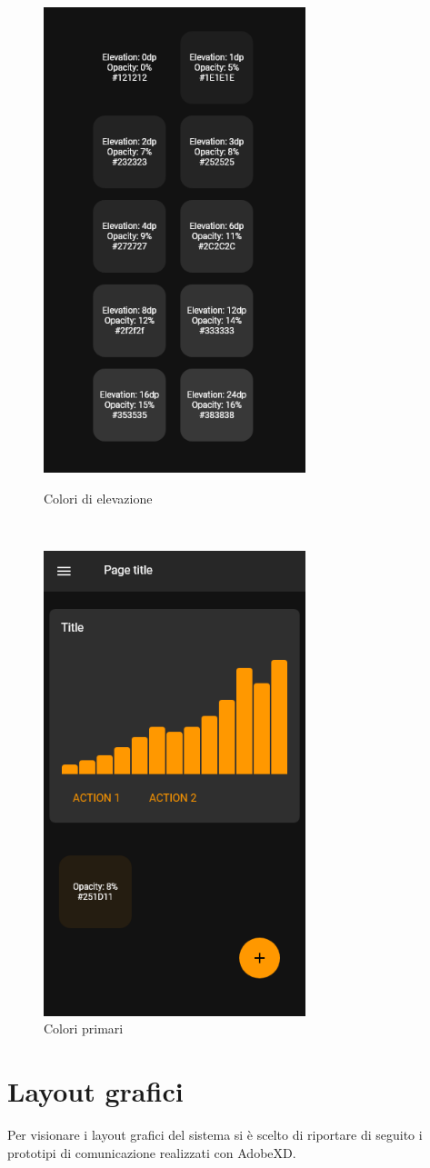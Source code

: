 \begin{figure}
	\centering
	\begin{minipage}[c]{0.45\textwidth}
		\centering
		\includegraphics[width=3.0in]{images/prototipo-comunicazione/Colors-Black}
		\caption{Colori di elevazione}
		\label{fig:colori:elevazioni}
	\end{minipage}~\begin{minipage}[c]{0.45\textwidth}
		\centering
		\includegraphics[width=3.0in]{images/prototipo-comunicazione/Colors-Primary}
		\caption{Colori primari}
		\label{fig:colori:primari}
	\end{minipage}
\end{figure}

\section{Layout grafici}\label{sec:layout-grafici}
Per visionare i layout grafici del sistema si è scelto di riportare di seguito 
i prototipi di comunicazione realizzati con AdobeXD.

